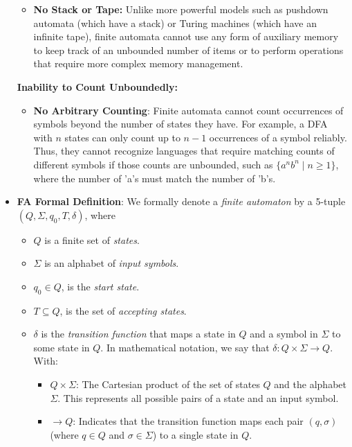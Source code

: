 \documentclass{report}
\begin{document}
\begin{itemize}
\begin{itemize}
            \item \textbf{No Stack or Tape:} Unlike more powerful models such as pushdown automata (which have a stack) or Turing machines (which have an infinite tape), finite automata cannot use any form of auxiliary memory to keep track of an unbounded number of items or to perform operations that require more complex memory management.
        \end{itemize}
        \bigbreak \noindent 
        \textbf{Inability to Count Unboundedly:}
        \begin{itemize}
            \item \textbf{No Arbitrary Counting}: Finite automata cannot count occurrences of symbols beyond the number of states they have. For example, a DFA with $n$ states can only count up to $n-1$ occurrences of a symbol reliably. Thus, they cannot recognize languages that require matching counts of different symbols if those counts are unbounded, such as $\{a^n b^n \mid n \geq 1\}$, where the number of 'a's must match the number of 'b's.
        \end{itemize}
    \item \textbf{FA Formal Definition}:
     We formally denote a \textit{finite automaton} by a 5-tuple $(Q, \Sigma, q_0, T, \delta)$, where
    \begin{itemize}
        \item $Q$ is a finite set of \textit{states}.
        \item $\Sigma$ is an alphabet of \textit{input symbols}.
        \item $q_0 \in Q$, is the \textit{start state}.
        \item $T \subseteq Q$, is the set of \textit{accepting states}.
        \item $\delta$ is the \textit{transition function} that maps a state in $Q$ and a symbol in $\Sigma$ to some state in $Q$. In mathematical notation, we say that $\delta: Q \times \Sigma \rightarrow Q$.
            With:
            \begin{itemize}
                \item $Q \times \Sigma$: The Cartesian product of the set of states $Q$ and the alphabet $\Sigma$. This represents all possible pairs of a state and an input symbol.
                \item $\rightarrow Q$: Indicates that the transition function maps each pair $(q, \sigma)$ (where $q \in Q$ and $\sigma \in \Sigma$) to a single state in $Q$.
            \end{itemize}

\end{itemize}
\end{itemize}
\end{document}
